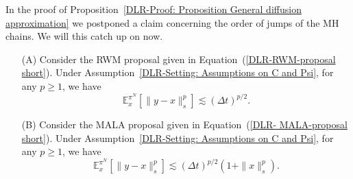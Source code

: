 In the proof of Proposition~\ref{DLR-Proof: Proposition General diffusion approximation} we postponed a claim concerning the order of jumps of the MH chains. We will this catch up on now.

\begin{lemma}\autocite[Lemma 4.2]{Pillai2012}
  \label{DLR: Lemma jump size of order(sqrt(Delta t))}
  \begin{enumerate}
    \item[(A)] Consider the RWM proposal given in Equation~(\ref{DLR-RWM-proposal short}). Under Assumption~\ref{DLR-Setting: Assumptions on C and Psi}, for any $p \geq 1$, we have
    \begin{equation*}
      \mathbb{E}^{\pi^N}_x [ \| y -x \|_s^p ] \lesssim (\Delta t)^{p/2}.
    \end{equation*}

    \item[(B)] Consider the MALA proposal given in Equation~(\ref{DLR- MALA-proposal short}). Under Assumption~\ref{DLR-Setting: Assumptions on C and Psi}, for any $p \geq 1$, we have
    \begin{equation*}
      \mathbb{E}^{\pi^N}_x [ \| y -x \|_s^p ] \lesssim (\Delta t)^{p/2} (1 + \| x \|_s^p).
    \end{equation*}
  \end{enumerate}

\end{lemma}

